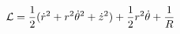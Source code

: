 \documentclass[preview]{standalone}
\begin{document}
\begin{align*}
\mathcal{L}=\frac 12(\dot{r}^2+r^2\dot{\theta}^2+\dot{z}^2)+\frac 12 r^2\dot{\theta}+{1\over R}
\end{align*}
\end{document}
